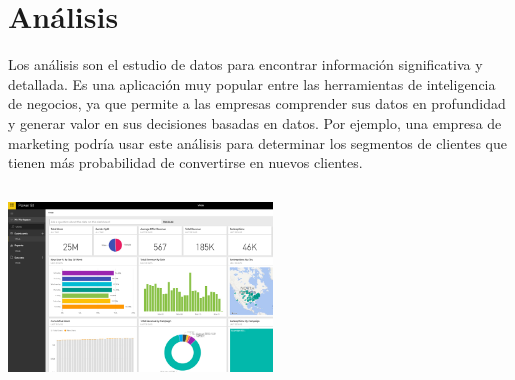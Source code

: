 \documentclass[twoside,twocolumn]{article}
\begin{document}
\section{Análisis}



    Los análisis son el estudio de datos para encontrar información significativa y detallada. Es una aplicación muy popular entre las herramientas de inteligencia de negocios, ya que permite a las empresas comprender sus datos en profundidad y generar valor en sus decisiones basadas en datos. Por ejemplo, una empresa de marketing podría usar este análisis para determinar los segmentos de clientes que tienen más probabilidad de convertirse en nuevos clientes.
    \\ \\
\includegraphics[width=7cm, height=5cm]{Imagenes/linea_bi1}
\end{document}
